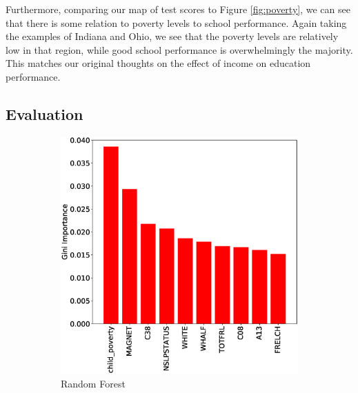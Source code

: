 Furthermore, comparing our map of test scores to Figure \ref{fig:poverty}, we can see that there is some relation to poverty levels to school performance. Again taking the examples of Indiana and Ohio, we see that the poverty levels are relatively low in that region, while good school performance is overwhelmingly the majority. This matches our original thoughts on the effect of income on education performance.

\subsection{Evaluation} \label{sec:evaluation}

\begin{figure}
	\begin{subfigure}{.45\textwidth}
		\includegraphics[width=\linewidth]{images/features_rf}
		\caption{Random Forest}
	\end{subfigure}
	\hspace{\fill}
	\begin{subfigure}{.45\textwidth}

\end{subfigure}
\end{figure}
